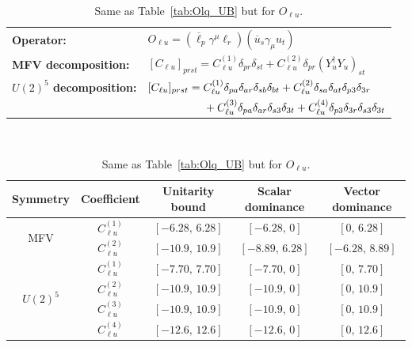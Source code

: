 \begin{table}[htbp]
\centering
{\small
\begin{tabular}{ll}
    \textbf{Operator:} &
        $\boxed{O_{\ell u} = (\overline\ell_p \gamma^\mu \ell_r)(\overline u_s \gamma_\mu u_t)}$ \\[0.2cm]
    \textbf{MFV decomposition:} &
        $[C_{\ell u}]_{prst} = C_{\ell u}^{(1)}\delta_{pr}\delta_{st} + C_{\ell u}^{(2)}\delta_{pr}(Y_u^\dagger Y_u)_{st}$ \\[0.15cm]
    \textbf{$U(2)^5$ decomposition:} &
        $[C_{\ell u}]_{prst} =
            C_{\ell u}^{(1)}\Pij{p}{r}{a}\Pij{s}{t}{b}
            + C_{\ell u}^{(2)}\Pij{s}{t}{a}\delta_{p3}\delta_{3r}$ \\
        & $\phantom{[C_{\ell u}]_{prst} ={}}+ C_{\ell u}^{(3)}\Pij{p}{r}{a}\delta_{s3}\delta_{3t}
            + C_{\ell u}^{(4)}\delta_{p3}\delta_{3r}\delta_{s3}\delta_{3t}$ \\
\end{tabular}
\\[0.3cm]
\renewcommand{\arraystretch}{1.3}
\begin{tabular}{ccccc}
    \toprule
    \rowcolor{hdrcolor}
    \textbf{Symmetry} & \textbf{Coefficient}
        & \textbf{Unitarity bound}
        & \textbf{Scalar dominance}
        & \textbf{Vector dominance} \\
    \midrule
    \multirow{2}{*}{MFV}
        & $C_{\ell u}^{(1)}$ & $[-6.28,\, 6.28]$  & $[-6.28,\, 0]$    & $[0,\, 6.28]$    \\
        & $C_{\ell u}^{(2)}$ & $[-10.9,\, 10.9]$  & $[-8.89,\, 6.28]$ & $[-6.28,\, 8.89]$ \\
    \midrule
    \multirow{4}{*}{$U(2)^5$}
        & $C_{\ell u}^{(1)}$ & $[-7.70,\, 7.70]$ & $[-7.70,\, 0]$ & $[0,\, 7.70]$ \\
        & $C_{\ell u}^{(2)}$ & $[-10.9,\, 10.9]$ & $[-10.9,\, 0]$ & $[0,\, 10.9]$ \\
        & $C_{\ell u}^{(3)}$ & $[-10.9,\, 10.9]$ & $[-10.9,\, 0]$ & $[0,\, 10.9]$ \\
        & $C_{\ell u}^{(4)}$ & $[-12.6,\, 12.6]$ & $[-12.6,\, 0]$ & $[0,\, 12.6]$ \\
    \bottomrule
\end{tabular}}
\caption{Same as Table~\ref{tab:Olq_UB} but for $O_{\ell u}$.}
\label{tab:Olu_UB}
\end{table}

